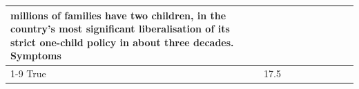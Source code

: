 \begin{table}[H]
\begin{tabular}{lllrlllll}
millions of families have two children, in the country's most significant liberalisation of its strict one-child policy in about three decades. Symptoms \\
\cline{1-9}
True & 17.5%
\end{tabular}
\end{table}
